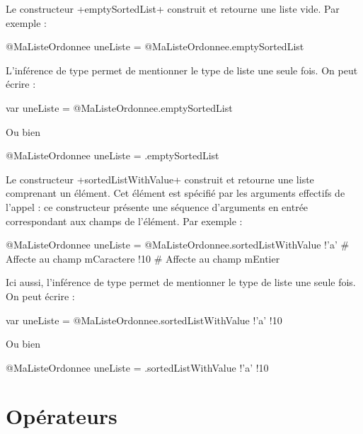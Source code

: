 
Le constructeur \ggs+emptySortedList+ construit et retourne une liste vide. Par exemple :
\begin{galgas}
@MaListeOrdonnee uneListe = @MaListeOrdonnee.emptySortedList
\end{galgas}

L'inférence de type permet de mentionner le type de liste une seule fois. On peut écrire :
\begin{galgas}
var uneListe = @MaListeOrdonnee.emptySortedList
\end{galgas}

Ou bien 
\begin{galgas}
@MaListeOrdonnee uneListe = .emptySortedList
\end{galgas}



Le constructeur \ggs+sortedListWithValue+ construit et retourne une liste comprenant un élément. Cet élément est spécifié par les arguments effectifs de l'appel : ce constructeur présente une séquence d'arguments en entrée correspondant aux champs de l'élément. Par exemple :

\begin{galgas}
@MaListeOrdonnee uneListe = @MaListeOrdonnee.sortedListWithValue {
  !'a' # Affecte au champ mCaractere
  !10  # Affecte au champ mEntier
}
\end{galgas}

Ici aussi, l'inférence de type permet de mentionner le type de liste une seule fois. On peut écrire :
\begin{galgas}
var uneListe = @MaListeOrdonnee.sortedListWithValue {!'a' !10}

\end{galgas}

Ou bien 
\begin{galgas}
@MaListeOrdonnee uneListe = .sortedListWithValue {!'a' !10}
\end{galgas}









\section{Opérateurs}







